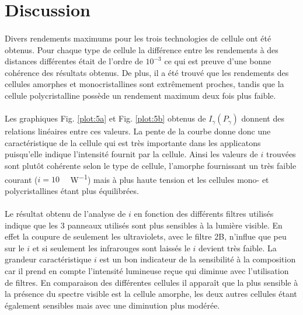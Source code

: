 \section{Discussion}



\paragraph{}
Divers rendements maximums pour les trois technologies de cellule ont été obtenus. Pour chaque type de cellule la différence entre les rendements à des distances différentes était de l'ordre de \(10^{-3}\) ce qui est preuve d'une bonne cohérence des résultats obtenus. De plus, il a été trouvé que les rendements des cellules amorphes et monocristallines sont extrêmement proches, tandis que la cellule polycristalline possède un rendement maximum deux fois plus faible.

\paragraph{}
Les graphiques Fig. \ref{plot:5a} et Fig. \ref{plot:5b} obtenus de \(I_\gamma (P_\gamma)\) donnent des relations linéaires entre ces valeurs. La pente de la courbe donne donc une caractéristique de la cellule qui est très importante dans les applicatons puisqu'elle indique l'intensité fournit par la cellule. Ainsi les valeurs de \(i\) trouvées sont plutôt cohérente selon le type de cellule, l'amorphe fournissant un très faible courant (\(i = 10\) \unit{\milli \amper \per \watt}) mais à plus haute tension et les cellules mono- et polycristallines étant plus équilibrées.

\paragraph{}
Le résultat obtenu de l'analyse de \(i\) en fonction des différents filtres utilisés indique que les 3 panneaux utilisés sont plus sensibles à la lumière visible. En effet la coupure de seulement les ultraviolets, avec le filtre 2B, n'influe que peu sur le \(i\) et si seulement les infrarouges sont laissés le \(i\) devient très faible. La grandeur caractéristique \(i\) est un bon indicateur de la sensibilité à la composition car il prend en compte l'intensité lumineuse reçue qui diminue avec l'utilisation de filtres. En comparaison des différentes cellules il apparaît que la plus sensible à la présence du spectre visible est la cellule amorphe, les deux autres cellules étant également sensibles mais avec une diminution plus modérée.


